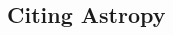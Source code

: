 \documentclass[10pt]{article}
\begin{document}
\begin{myposter}
\begin{myshadowfixed}{375mm}{20mm}
\section*{Citing Astropy}

\vfill
\end{myshadowfixed}%
%
%
\end{myposter}
\end{document}
